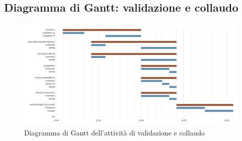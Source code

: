 \subsection{Diagramma di Gantt: validazione e collaudo}\label{PianificazioneDiagrammaDiGanttValidazione}
\begin{figure}[!h]
	\begin{center}
		\includegraphics[width=1\linewidth]{../immagini/pdp/gantt_validazione3.png}
		\caption{Diagramma di Gantt dell'attività di validazione e collaudo}
	\end{center}
\end{figure}

